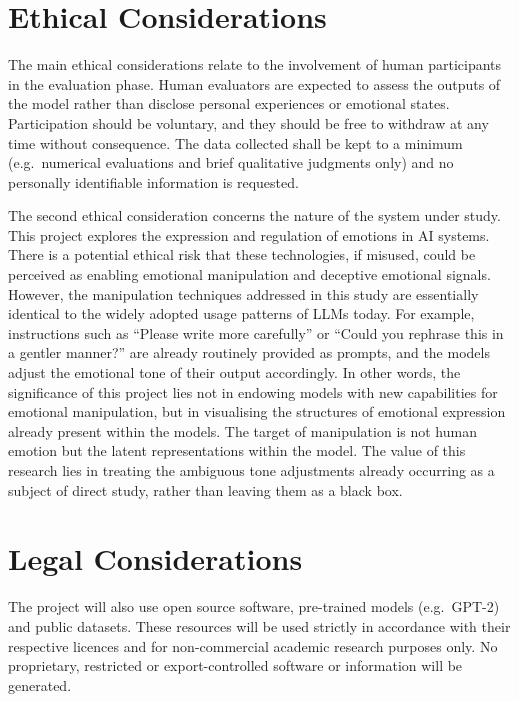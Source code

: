 \documentclass[12pt,twoside]{report}
\begin{document}
\section{Ethical Considerations}
The main ethical considerations relate to the involvement of human participants in the evaluation phase. Human evaluators are expected to assess the outputs of the model rather than disclose personal experiences or emotional states. Participation should be voluntary, and they should be free to withdraw at any time without consequence. The data collected shall be kept to a minimum (e.g.\ numerical evaluations and brief qualitative judgments only) and no personally identifiable information is requested.

The second ethical consideration concerns the nature of the system under study. This project explores the expression and regulation of emotions in AI systems. There is a potential ethical risk that these technologies, if misused, could be perceived as enabling emotional manipulation and deceptive emotional signals. However, the manipulation techniques addressed in this study are essentially identical to the widely adopted usage patterns of LLMs today. For example, instructions such as ``Please write more carefully'' or ``Could you rephrase this in a gentler manner?'' are already routinely provided as prompts, and the models adjust the emotional tone of their output accordingly. In other words, the significance of this project lies not in endowing models with new capabilities for emotional manipulation, but in visualising the structures of emotional expression already present within the models. The target of manipulation is not human emotion but the latent representations within the model. The value of this research lies in treating the ambiguous tone adjustments already occurring as a subject of direct study, rather than leaving them as a black box.

\section{Legal Considerations}

The project will also use open source software, pre-trained models (e.g.\ GPT-2) and public datasets. These resources will be used strictly in accordance with their respective licences and for non-commercial academic research purposes only. No proprietary, restricted or export-controlled software or information will be generated.



\end{document}
